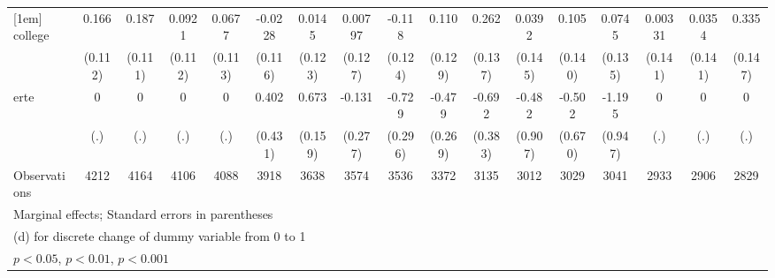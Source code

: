 {\begin{tabular}{l*{16}{c}}
[1em]
college             &       0.166         &       0.187         &      0.0921         &      0.0677         &     -0.0228         &      0.0145         &     0.00797         &      -0.118         &       0.110         &       0.262         &      0.0392         &       0.105         &      0.0745         &     0.00331         &      0.0354         &       0.335\sym{*}  \\
                    &     (0.112)         &     (0.111)         &     (0.112)         &     (0.113)         &     (0.116)         &     (0.123)         &     (0.127)         &     (0.124)         &     (0.129)         &     (0.137)         &     (0.145)         &     (0.140)         &     (0.135)         &     (0.141)         &     (0.141)         &     (0.147)         \\
[1em]
erte                &           0         &           0         &           0         &           0         &       0.402         &       0.673\sym{***}&      -0.131         &      -0.729\sym{*}  &      -0.479         &      -0.692         &      -0.482         &      -0.502         &      -1.195         &           0         &           0         &           0         \\
                    &         (.)         &         (.)         &         (.)         &         (.)         &     (0.431)         &     (0.159)         &     (0.277)         &     (0.296)         &     (0.269)         &     (0.383)         &     (0.907)         &     (0.670)         &     (0.947)         &         (.)         &         (.)         &         (.)         \\
\hline
Observations        &        4212         &        4164         &        4106         &        4088         &        3918         &        3638         &        3574         &        3536         &        3372         &        3135         &        3012         &        3029         &        3041         &        2933         &        2906         &        2829         \\
\hline\hline
\multicolumn{17}{l}{\footnotesize Marginal effects; Standard errors in parentheses}\\
\multicolumn{17}{l}{\footnotesize  (d) for discrete change of dummy variable from 0 to 1}\\
\multicolumn{17}{l}{\footnotesize \sym{*} \(p<0.05\), \sym{**} \(p<0.01\), \sym{***} \(p<0.001\)}\\
\end{tabular}
}
